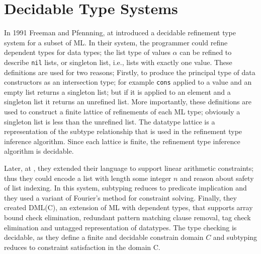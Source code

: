 	\newcommand\qset{\ensuremath{\mathbb{Q}}}
\newcommand\NV[1]{\columnbreak}


\section{Decidable Type Systems}\label{sec:liquid}

In 1991 Freeman and Pfennning, at \cite{FreemanPfenning91} introduced
a decidable refinement type system for a subset of ML.
%
In their system, the programmer could refine dependent
types for data types; 
the list type of values $\alpha$ can be refined to 
describe \texttt{nil} lists, or singleton list, i.e., lists
with exactly one value.
%
These definitions are used for two reasons;
Firstly, to produce the principal type of 
data constructors as an intersection type;
for example \texttt{cons} applied to a value and an empty
list returns a singleton list; but if it is applied
to an element and a singleton list it returns an unrefined list.
More importantly, these definitions are used to 
construct a finite lattice of refinements of each ML type; 
obviously a singleton list is less than the unrefined list.
%
The datatype lattice is a representation of the subtype
relationship that is used in the 
refinement type inference algorithm. 
Since each lattice is finite, the refinement type
inference algorithm is decidable.

Later, at \cite{pfenningxi98}, 
they extended their language to support
linear arithmetic constraints; thus they could
encode a list with length some integer $n$ and 
reason about safety of list indexing.
In this system, subtyping reduces to predicate implication
and they used a variant of Fourier's method \cite{OmegaTestCACM} 
for constraint solving.
%
Finally, they created DML(C)\cite{XiPfenning99}, 
an extension of ML with dependent types, that supports 
array bound check elimination,
redundant pattern matching clause removal, 
tag check elimination and untagged representation of datatypes.
The type checking is decidable, as they define a finite and decidable
constrain domain $C$ and subtyping reduces to constraint satisfaction in the 
domain C.
%

